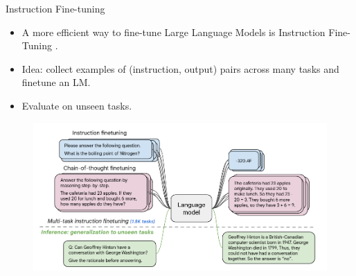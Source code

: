 \documentclass[handout]{beamer}
\begin{document}
\begin{frame}{Instruction Fine-tuning}

\begin{scriptsize}
\begin{itemize}
\item A more efficient way to fine-tune Large Language Models is Instruction Fine-Tuning  \cite{chung2022scaling}.
\item Idea: collect examples of (instruction, output) pairs across many tasks and finetune an LM.
\item Evaluate on unseen tasks.
\end{itemize}

\begin{figure}[h]
	\includegraphics[scale = 0.35]{pics/instructionfinetuning.png}
\end{figure}


\end{scriptsize}






\end{frame}
\end{document}

